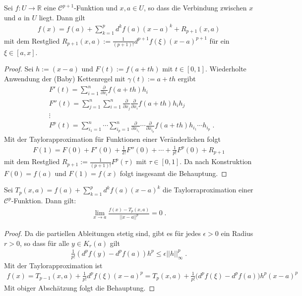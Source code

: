 \begin{Satz}[Taylorapproximation]
Sei   $f: U \to \mathbb{R}$ eine $\mathcal{C}^{p+1}$-Funktion und $x,a \in U$, so dass die Verbindung zwischen $x$ und $a$ in $U$ liegt.
Dann gilt
\begin{align*}
f(x) = f(a) + \sum_{k=1}^{p} d^k f(a) (x-a)^k + R_{p+1} (x,a)
\end{align*}
mit dem Restglied $R_{p+1} (x,a) := \frac{1}{(p+1)!} d^{p+1}f(\xi) (x-a)^{p+1}$ für ein $\xi \in [a,x]$.
\end{Satz}

\begin{proof}
Sei $h := (x-a)$ und $F(t) := f(a + th)$ mit $t \in [0,1]$. Wiederholte Anwendung der (Baby) Kettenregel mit $\gamma(t) := a +th$ ergibt
\begin{align*}
& F'(t) = \sum_{i=1}^n  \frac{\partial}{\partial x_{i}} f(a + th) h_i \\
& F''(t) =\sum_{j=1}^n \sum_{i=1}^n   \frac{\partial}{\partial x_{j}} \frac{\partial}{\partial x_{i}} f(a + th) h_i h_j \\
& \vdots \\
& F^p(t) =  \sum_{i_1=1}^n  \cdots \sum_{i_p=1}^n   \frac{\partial}{\partial x_{i_1}} \cdots \frac{\partial}{\partial x_{i_p}} f(a + th) h_{i_1} \cdots  h_{i_p}  \; .
\end{align*}
Mit der Taylorapproximation für Funktionen einer Veränderlichen folgt
\begin{align*}
 F(1) = F(0) + F'(0) + \frac{1}{2!} F''(0) + \cdots + \frac{1}{p!} F^p(0) + R_{p+1} 
\end{align*}
mit dem Restglied $ R_{p+1}  :=  \frac{1}{(p+1)!}  F^p(\tau)$ mit $\tau \in [0,1]$.
Da nach Konstruktion $F(0) = f(a)$ und $F(1)= f(x)$ folgt insgesamt die Behauptung.
\end{proof}


\begin{Satz}
Sei $T_p(x,a) =  f(a) + \sum_{k=1}^{p} d^k f(a) (x-a)^k$ die Taylorraproximation einer $\mathcal{C}^{p}$-Funktion. Dann gilt: 
\begin{align*}
\lim_{x \to a} \frac{f(x) - T_p(x,a)}{  || x-a  ||^p} = 0 \;. 
\end{align*}
\end{Satz}
\begin{proof}
Da die partiellen Ableitungen stetig sind, gibt es für jedes $\epsilon > 0$ ein Radius $r >0$, so dass für alle $y \in K_r(a)$ gilt
\begin{align*}
\frac{1}{p!} (d^pf(y) -d^pf(a))h^p \leq \epsilon ||h||_{\infty}^p \; . 
\end{align*}
Mit der Taylorapproximation ist 
\begin{align*}
f(x) = T_{p-1}(x, a) +  \frac{1}{p!} d^{p}f(\xi) (x-a)^{p} = T_p(x,a) +  \frac{1}{p!} \bigl( d^pf(\xi) -d^pf(a) \bigr) h^p (x-a)^p
\end{align*} 
Mit obiger Abschätzung folgt die Behauptung.
\end{proof}

